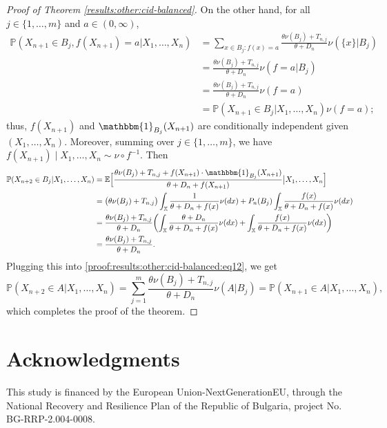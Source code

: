 \documentclass[a4paper]{article}
\theoremstyle{plain}
\theoremstyle{remark}
\theoremstyle{definition}
\begin{document}
\begin{proof}[Proof of Theorem \ref{results:other:cid-balanced}]
On the other hand, for all $j\in\{1,\ldots,m\}$ and $a\in(0,\infty)$,
\begingroup\allowdisplaybreaks
\begin{align*}
\mathbb{P}(X_{n+1}\in B_j,f(X_{n+1})=a|X_1,\ldots,X_n)&=\sum_{x\in B_j:f(x)=a}\frac{\theta\nu(B_j)+T_{n,j}}{\theta+D_n}\nu(\{x\}|B_j)\\
&=\frac{\theta\nu(B_j)+T_{n,j}}{\theta+D_n}\nu(f=a|B_j)\\
&=\frac{\theta\nu(B_j)+T_{n,j}}{\theta+D_n}\nu(f=a)\\
&=\mathbb{P}(X_{n+1}\in B_j|X_1,\ldots,X_n)\nu(f=a);
\end{align*}
\endgroup
thus, $f(X_{n+1})$ and $\mathbbm{1}_{B_j}(X_{n+1})$ are conditionally independent given $(X_1,\ldots,X_n)$. Moreover, summing over $j\in\{1,\ldots,m\}$, we have $f(X_{n+1})\mid X_1,\ldots,X_n\sim\nu\circ f^{-1}$. Then
\begingroup\allowdisplaybreaks
\begin{align*}
\mathbb{P}(X_{n+2}\in B_j|X_1,\ldots,X_n)&=\mathbb{E}\Bigl[\frac{\theta\nu(B_j)+T_{n,j}+f(X_{n+1})\cdot\mathbbm{1}_{B_j}(X_{n+1})}{\theta+D_n+f(X_{n+1})}\bigr|X_1,\ldots,X_n\Bigr]\\
&=\bigl(\theta\nu(B_j)+T_{n,j}\bigr)\int_\mathbb{X}\frac{1}{\theta+D_n+f(x)}\nu(dx)+P_n(B_j)\int_{\mathbb{X}}\frac{f(x)}{\theta+D_n+f(x)}\nu(dx)\\
&=\frac{\theta\nu(B_j)+T_{n,j}}{\theta+D_n}\biggl(\int_\mathbb{X}\frac{\theta+D_n}{\theta+D_n+f(x)}\nu(dx)+\int_{\mathbb{X}}\frac{f(x)}{\theta+D_n+f(x)}\nu(dx)\biggr)\\
&=\frac{\theta\nu(B_j)+T_{n,j}}{\theta+D_n}.
\end{align*}
\endgroup
Plugging this into \eqref{proof:results:other:cid-balanced:eq12}, we get
\[\mathbb{P}(X_{n+2}\in A|X_1,\ldots,X_n)=\sum_{j=1}^m\frac{\theta\nu(B_j)+T_{n,j}}{\theta+D_n}\nu(A|B_j)=\mathbb{P}(X_{n+1}\in A|X_1,\ldots,X_n),\]
which completes the proof of the theorem.
\end{proof}

\section*{Acknowledgments}

This study is financed by the European Union-NextGenerationEU, through the National Recovery and Resilience Plan of the Republic of Bulgaria, project No. BG-RRP-2.004-0008.

 
\end{document}
